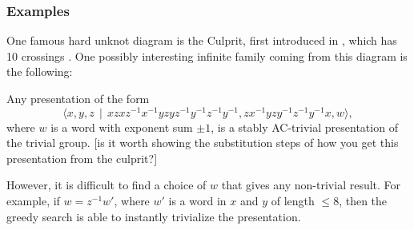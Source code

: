 \subsubsection{Examples}
One famous hard unknot diagram is the Culprit, first introduced in \cite{kauffman2014hardunknotscollapsingtangles}, which has 10 crossings . One possibly interesting infinite family coming from this diagram is the following:
\begin{proposition}
    Any presentation of the form
    \[
\langle x,y,z \,\mid \, xzxz^{-1}x^{-1}yzyz^{-1}y^{-1}z^{-1}y^{-1}, zx^{-1}yzy^{-1}z^{-1}y^{-1}x, w \rangle,
\] where $w$ is a word with exponent sum $\pm 1$, is a stably AC-trivial presentation of the trivial group. [is it worth showing the substitution steps of how you get this presentation from the culprit?]
\end{proposition}
However, it is difficult to find a choice of $w$ that gives any non-trivial result. For example, if $w=z^{-1}w'$, where $w'$ is a word in $x$ and $y$ of length $\leq 8$, then the greedy search is able to instantly trivialize the presentation.